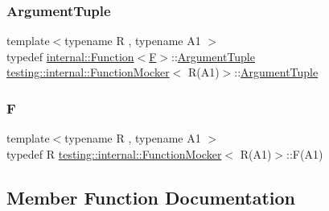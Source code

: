 \subsubsection{\texorpdfstring{Argument\+Tuple}{ArgumentTuple}}
{\footnotesize\ttfamily template$<$typename R , typename A1 $>$ \\
typedef \hyperlink{structtesting_1_1internal_1_1_function}{internal\+::\+Function}$<$\hyperlink{classtesting_1_1internal_1_1_function_mocker_3_01_r_07_a1_08_4_ada54286442ab14a18c2308cef748848f}{F}$>$\+::\hyperlink{classtesting_1_1internal_1_1_function_mocker_3_01_r_07_a1_08_4_aacec6412ac4343c071d7dfe965558b0b}{Argument\+Tuple} \hyperlink{classtesting_1_1internal_1_1_function_mocker}{testing\+::internal\+::\+Function\+Mocker}$<$ R(A1)$>$\+::\hyperlink{classtesting_1_1internal_1_1_function_mocker_3_01_r_07_a1_08_4_aacec6412ac4343c071d7dfe965558b0b}{Argument\+Tuple}}

\mbox{\label{classtesting_1_1internal_1_1_function_mocker_3_01_r_07_a1_08_4_ada54286442ab14a18c2308cef748848f}} 
\subsubsection{\texorpdfstring{F}{F}}
{\footnotesize\ttfamily template$<$typename R , typename A1 $>$ \\
typedef R \hyperlink{classtesting_1_1internal_1_1_function_mocker}{testing\+::internal\+::\+Function\+Mocker}$<$ R(A1)$>$\+::F(A1)}



\subsection{Member Function Documentation}
\mbox{\label{classtesting_1_1internal_1_1_function_mocker_3_01_r_07_a1_08_4_a4a58d37902572c8136d999c5008dce1a}} 
